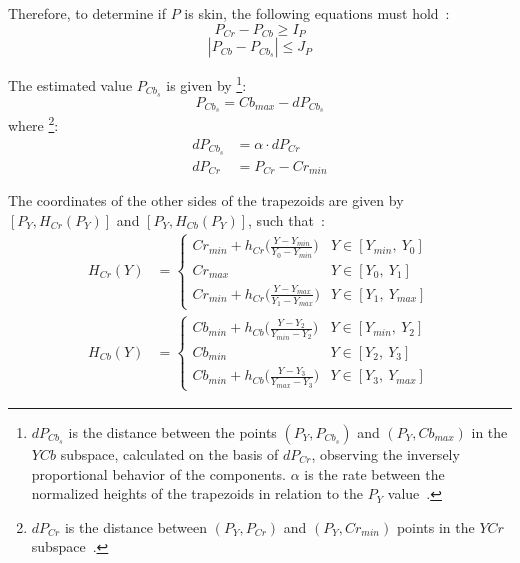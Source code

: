 Therefore, to determine if $P$ is skin, the following equations must hold~\citep{brancati:17}:
\begin{equation}
    P_{Cr} - P_{Cb} \geq I_P
\label{condition_c0}
\end{equation}
\begin{equation}
   |P_{Cb} - P_{Cb_s}| \leq J_P
\label{condition_c1}
\end{equation}

The estimated value $P_{Cb_{s}}$ is given by \footnote{$dP_{Cb_{s}}$ is the distance between the points $(P_Y, P_{Cb_{s}})$ and $(P_Y, Cb_{max})$ in the $YCb$ subspace, calculated on the basis of $dP_{Cr}$, observing the inversely proportional behavior of the components. $\alpha$ is the rate between the normalized heights of the trapezoids in relation to the $P_Y$ value~\citep{brancati:17}.}:
\begin{equation}
    P_{Cb_s} = Cb_{max} - dP_{Cb_s}
\end{equation}
where \footnote{$dP_{Cr}$ is the distance between $(P_Y, P_{Cr})$ and $(P_Y, Cr_{min})$ points in the $YCr$ subspace~\citep{brancati:17}.}:
\begin{align}
    dP_{Cb_s} &= \alpha \cdot dP_{Cr}
    \\
    dP_{Cr} &= P_{Cr} - Cr_{min}
\end{align}

The coordinates of the other sides of the trapezoids are given by $[P_Y, H_{Cr}(P_Y)]$ and $[P_Y, H_{Cb}(P_Y)]$, such that~\citep{brancati:17}:
\begin{align}
  H_{Cr}(Y) &=  \begin{cases}
                Cr_{min} + h_{Cr}\big(\frac{Y - Y_{min}}{Y_0 - Y_{min}}\big) & Y \in [Y_{min},\ Y_0] \\
                Cr_{max} & Y \in [Y_0,\ Y_1] \\
                Cr_{min} + h_{Cr}\big(\frac{Y - Y_{max}}{Y_1 - Y_{max}}\big) & Y \in [Y_1,\ Y_{max}]
              \end{cases}
\\
  H_{Cb}(Y) &=  \begin{cases}
                Cb_{min} + h_{Cb}\big(\frac{Y - Y_2}{Y_{min} - Y_2}\big) & Y \in [Y_{min},\ Y_2] \\
                Cb_{min} & Y \in [Y_2,\ Y_3] \\
                Cb_{min} + h_{Cb}\big(\frac{Y - Y_3}{Y_{max} - Y_3}\big) & Y \in [Y_3,\ Y_{max}]
              \end{cases}
\end{align}


